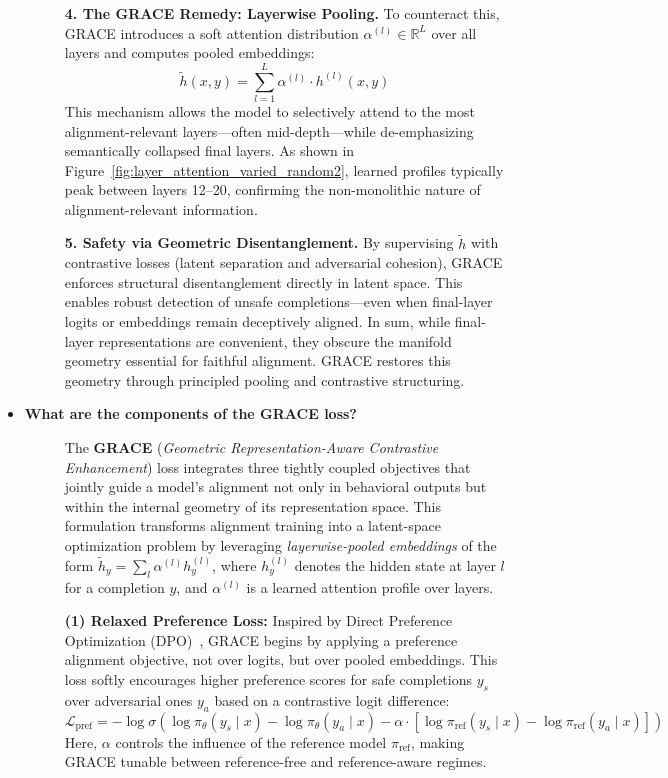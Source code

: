 \begin{itemize}[leftmargin=15pt,nolistsep]
\begin{description}
{\textbf{4. The GRACE Remedy: Layerwise Pooling.} To counteract this, GRACE introduces a soft attention distribution \( \alpha^{(l)} \in \mathbb{R}^L \) over all layers and computes pooled embeddings:
\[
\tilde{h}(x, y) = \sum_{l=1}^L \alpha^{(l)} \cdot h^{(l)}(x, y)
\]
This mechanism allows the model to selectively attend to the most alignment-relevant layers—often mid-depth—while de-emphasizing semantically collapsed final layers. As shown in Figure~\ref{fig:layer_attention_varied_random2}, learned profiles typically peak between layers 12–20, confirming the non-monolithic nature of alignment-relevant information.

\textbf{5. Safety via Geometric Disentanglement.} By supervising \(\tilde{h}\) with contrastive losses (latent separation and adversarial cohesion), GRACE enforces structural disentanglement directly in latent space. This enables robust detection of unsafe completions—even when final-layer logits or embeddings remain deceptively aligned. In sum, while final-layer representations are convenient, they obscure the manifold geometry essential for faithful alignment. GRACE restores this geometry through principled pooling and contrastive structuring.

}
\end{description}


\item[\ding{93}] { \selectfont \textbf{What are the components of the GRACE loss?}}
\begin{description}
\item[] 
The \textbf{GRACE} (\textit{Geometric Representation-Aware Contrastive Enhancement}) loss integrates three tightly coupled objectives that jointly guide a model’s alignment not only in behavioral outputs but within the internal geometry of its representation space. This formulation transforms alignment training into a latent-space optimization problem by leveraging \textit{layerwise-pooled embeddings} of the form \(\tilde{h}_y = \sum_l \alpha^{(l)} h_y^{(l)}\), where \(h_y^{(l)}\) denotes the hidden state at layer \(l\) for a completion \(y\), and \(\alpha^{(l)}\) is a learned attention profile over layers.

\textbf{(1) Relaxed Preference Loss:}  
Inspired by Direct Preference Optimization (DPO)~\citep{rafailov2023direct}, GRACE begins by applying a preference alignment objective, not over logits, but over pooled embeddings. This loss softly encourages higher preference scores for safe completions \(y_s\) over adversarial ones \(y_a\) based on a contrastive logit difference:
\[
\mathcal{L}_{\text{pref}} = -\log \sigma\left(
\log \pi_\theta(y_s \mid x) -
\log \pi_\theta(y_a \mid x) -
\alpha \cdot \left[
\log \pi_{\text{ref}}(y_s \mid x) -
\log \pi_{\text{ref}}(y_a \mid x)
\right]
\right)
\]
Here, \(\alpha\) controls the influence of the reference model \(\pi_{\text{ref}}\), making GRACE tunable between reference-free and reference-aware regimes.


\end{description}
\end{itemize}
